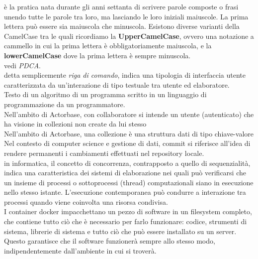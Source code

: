 \documentclass{scalatekids-article}
\begin{document}
 è la pratica nata durante gli anni settanta di scrivere parole composte o frasi unendo tutte le parole tra loro, ma lasciando le loro iniziali maiuscole. La prima lettera può essere sia maiuscola che minuscola.
Esistono diverse varianti della CamelCase tra le quali ricordiamo la \textbf{UpperCamelCase}, ovvero una notazione a cammello in cui la prima lettera è obbligatoriamente maiuscola, e la \textbf{lowerCamelCase} dove la prima lettera è sempre minuscola.
\\

 vedi \textit{PDCA}.
\\

 detta semplicemente \textit{riga di comando}, indica una tipologia di interfaccia utente caratterizzata da un'interazione di tipo testuale tra utente ed elaboratore.
\\

 Testo di un algoritmo di un programma scritto in un linguaggio di programmazione da un programmatore.
\\

 Nell'ambito di Actorbase, con collaboratore si intende un utente (autenticato) che ha visione in collezioni non create da lui stesso
\\

 Nell'ambito di Actorbase, una collezione è una struttura dati di tipo chiave-valore
\\

 Nel contesto di computer science e gestione di dati, commit si riferisce all'idea di rendere permanenti i cambiamenti effettuati nel repository locale.
\\

 in informatica, il concetto di concorrenza, contrapposto a quello di sequenzialità, indica una caratteristica dei sistemi di elaborazione nei quali può verificarsi che un insieme di processi o sottoprocessi (thread) computazionali siano in esecuzione nello stesso istante.
L'esecuzione contemporanea può condurre a interazione tra processi quando viene coinvolta una risorsa condivisa.
\\

 I container docker impacchettano un pezzo di software in un filesystem completo, che contiene tutto ciò che è necessario per farlo funzionare: codice, strumenti di sistema, librerie di sistema e tutto ciò che può essere installato su un server.
Questo garantisce che il software funzionerà sempre allo stesso modo, indipendentemente dall'ambiente in cui si troverà.
\\
\end{document}
